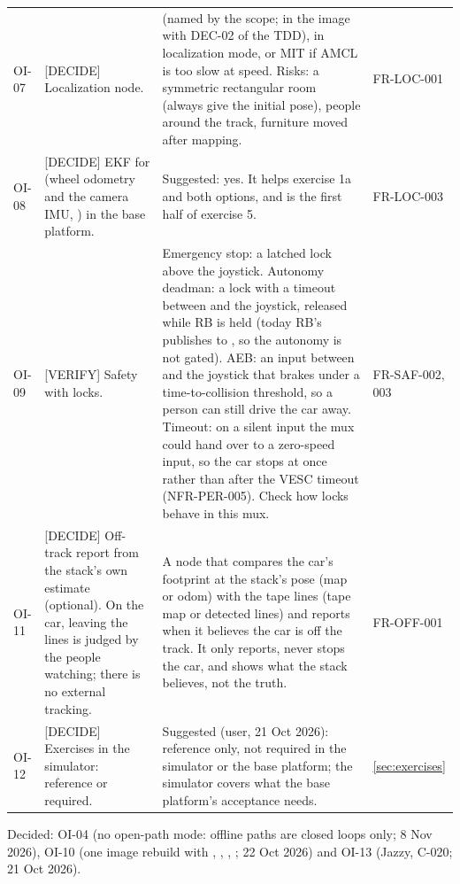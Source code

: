 \documentclass[11pt,a4paper]{article}
\begin{document}
\begin{small}
\begin{tabularx}{\textwidth}{@{}L{1.1cm} L{3.4cm} Y L{1.9cm}@{}}
OI-07 & [DECIDE] Localization node. &  (named by the scope; in the image with DEC-02 of the TDD),  in localization mode, or MIT  if AMCL is too slow at speed. Risks: a symmetric rectangular room (always give the initial pose), people around the track, furniture moved after mapping. & FR-LOC-001 \\
OI-08 & [DECIDE] EKF for  (wheel odometry and the camera IMU, ) in the base platform. & Suggested: yes. It helps exercise 1a and both options, and is the first half of exercise 5. & FR-LOC-003 \\
OI-09 & [VERIFY] Safety with  locks. & Emergency stop: a latched lock above the joystick. Autonomy deadman: a lock with a timeout between  and the joystick, released while RB is held (today RB's  publishes to , so the autonomy is not gated). AEB: an input between  and the joystick that brakes under a time-to-collision threshold, so a person can still drive the car away. Timeout: on a silent input the mux could hand over to a zero-speed input, so the car stops at once rather than after the VESC timeout (NFR-PER-005). Check how locks behave in this mux. & FR-SAF-002, 003 \\
OI-11 & [DECIDE] Off-track report from the stack's own estimate (optional). On the car, leaving the lines is judged by the people watching; there is no external tracking. & A node that compares the car's footprint at the stack's pose (map or odom) with the tape lines (tape map or detected lines) and reports when it believes the car is off the track. It only reports, never stops the car, and shows what the stack believes, not the truth. & FR-OFF-001 \\
OI-12 & [DECIDE] Exercises in the simulator: reference or required. & Suggested (user, 21 Oct 2026): reference only, not required in the simulator or the base platform; the simulator covers what the base platform's acceptance needs. & \cref{sec:exercises} \\
\bottomrule
\end{tabularx}
\end{small}

Decided: OI-04 (no open-path mode: offline paths are closed loops only; 8 Nov 2026), OI-10 (one image rebuild with , , , ; 22 Oct 2026) and OI-13 (Jazzy, C-020; 21 Oct 2026).
\end{document}
